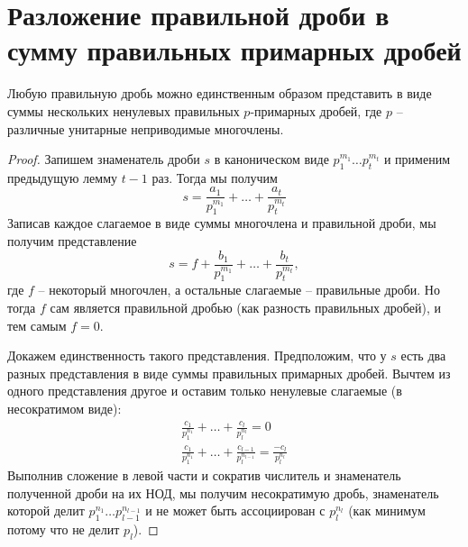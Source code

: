 \section{Разложение правильной дроби в сумму правильных примарных дробей}
\begin{theorem-non}
    Любую правильную дробь можно единственным образом представить в виде суммы нескольких ненулевых правильных $p$-примарных дробей, 
    где $p$ -- различные унитарные неприводимые многочлены.
\end{theorem-non}

\begin{proof}
    Запишем знаменатель дроби $s$ в каноническом виде $p_1^{m_1} \dots p_t^{m_t}$ и применим предыдущую лемму $t - 1$ раз. 
    Тогда мы получим \[ s = \frac{a_1}{p_1^{m_1}} + \dots + \frac{a_t}{p_t^{m_t}} \]
    Записав каждое слагаемое в виде суммы многочлена и правильной дроби, мы получим представление
    \[ s = f + \frac{b_1}{p_1^{m_1}} + \dots + \frac{b_t}{p_t^{m_t}}, \]
    где $f$ -- некоторый многочлен, а остальные слагаемые -- правильные дроби. 
    Но тогда $f$ сам является правильной дробью (как разность правильных дробей), и тем самым $f = 0$.

    Докажем единственность такого представления. 
    Предположим, что у $s$ есть два разных представления в виде суммы правильных примарных дробей. 
    Вычтем из одного представления другое и оставим только ненулевые слагаемые (в несократимом виде):
    \begin{gather*}
        \frac{c_1}{p_1^{n_1}} + \dots + \frac{c_l}{p_l^{n_l}} = 0 \\
        \frac{c_1}{p_1^{n_1}} + \dots + \frac{c_{l - 1}}{p_l^{n_{l - 1}}} = \frac{-c_l}{p_l^{n_l}}
    \end{gather*}
    Выполнив сложение в левой части и сократив числитель и знаменатель полученной дроби на их НОД, мы получим несократимую дробь,
    знаменатель которой делит $p_1^{n_1} \dots p_{l - 1}^{n_{l - 1}}$ и не может быть ассоциирован с $p_l^{n_l}$ (как минимум потому что не делит $p_l$).
    
\end{proof}
